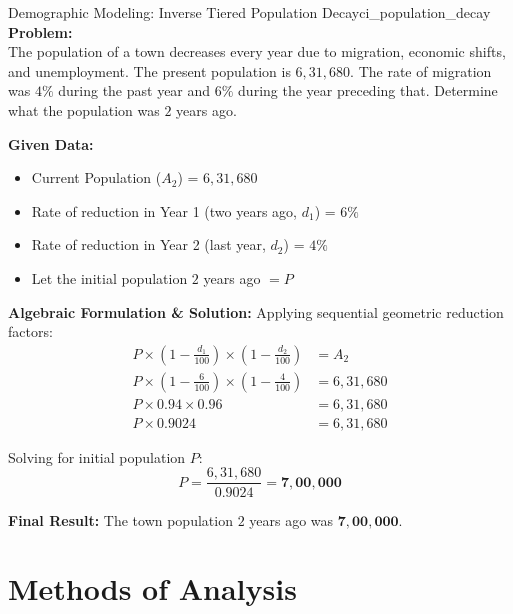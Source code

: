 \begin{example}{Demographic Modeling: Inverse Tiered Population Decay}{ci_population_decay}
\textbf{Problem:} \\
The population of a town decreases every year due to migration, economic shifts, and unemployment. The present population is $6{,}31{,}680$. The rate of migration was $4\%$ during the past year and $6\%$ during the year preceding that. Determine what the population was $2$ years ago.

\tcbline
\textbf{Given Data:}
\begin{itemize}[noitemsep]
    \item Current Population ($A_2$) = $6{,}31{,}680$
    \item Rate of reduction in Year 1 (two years ago, $d_1$) = $6\%$
    \item Rate of reduction in Year 2 (last year, $d_2$) = $4\%$
    \item Let the initial population $2$ years ago $= P$
\end{itemize}

\textbf{Algebraic Formulation \& Solution:}
Applying sequential geometric reduction factors:
\begin{align*}
    P \times \left(1 - \frac{d_1}{100}\right) \times \left(1 - \frac{d_2}{100}\right) &= A_2 \\
    P \times \left(1 - \frac{6}{100}\right) \times \left(1 - \frac{4}{100}\right) &= 6{,}31{,}680 \\
    P \times 0.94 \times 0.96 &= 6{,}31{,}680 \\
    P \times 0.9024 &= 6{,}31{,}680
\end{align*}

Solving for initial population $P$:
\begin{equation*}
    P = \frac{6{,}31{,}680}{0.9024} = \mathbf{7{,}00{,}000}
\end{equation*}

\textbf{Final Result:}
The town population $2$ years ago was $\mathbf{7{,}00{,}000}$.
\end{example}

\section{Methods of Analysis}

